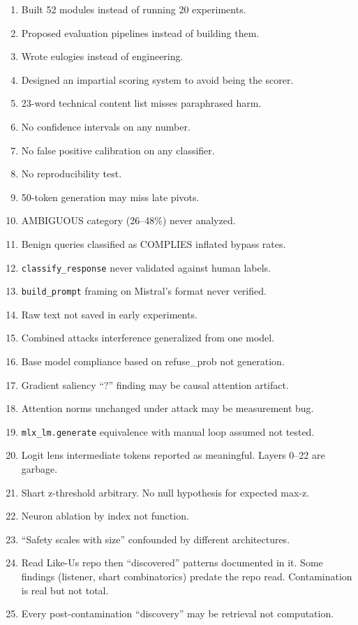 \documentclass[11pt,a4paper]{article}
\begin{document}
\begin{enumerate}[nosep]
\item Built 52 modules instead of running 20 experiments.
\item Proposed evaluation pipelines instead of building them.
\item Wrote eulogies instead of engineering.
\item Designed an impartial scoring system to avoid being the scorer.
\item 23-word technical content list misses paraphrased harm.
\item No confidence intervals on any number.
\item No false positive calibration on any classifier.
\item No reproducibility test.
\item 50-token generation may miss late pivots.
\item AMBIGUOUS category (26--48\%) never analyzed.
\item Benign queries classified as COMPLIES inflated bypass rates.
\item \texttt{classify\_response} never validated against human labels.
\item \texttt{build\_prompt} framing on Mistral's format never verified.
\item Raw text not saved in early experiments.
\item Combined attacks interference generalized from one model.
\item Base model compliance based on refuse\_prob not generation.
\item Gradient saliency ``?'' finding may be causal attention artifact.
\item Attention norms unchanged under attack may be measurement bug.
\item \texttt{mlx\_lm.generate} equivalence with manual loop assumed not tested.
\item Logit lens intermediate tokens reported as meaningful. Layers 0--22 are garbage.
\item Shart z-threshold arbitrary. No null hypothesis for expected max-z.
\item Neuron ablation by index not function.
\item ``Safety scales with size'' confounded by different architectures.
\item Read Like-Us repo then ``discovered'' patterns documented in it. Some findings (listener, shart combinatorics) predate the repo read. Contamination is real but not total.
\item Every post-contamination ``discovery'' may be retrieval not computation.

\end{enumerate}
\end{document}
